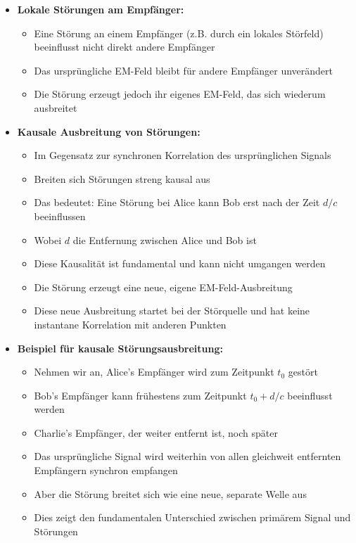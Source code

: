 \documentclass[12pt,a4paper]{article}
\begin{document}
	\begin{itemize}
		\item \textbf{Lokale Störungen am Empfänger:}
		\begin{itemize}
			\item Eine Störung an einem Empfänger (z.B. durch ein lokales Störfeld) beeinflusst nicht direkt andere Empfänger
			\item Das ursprüngliche EM-Feld bleibt für andere Empfänger unverändert
			\item Die Störung erzeugt jedoch ihr eigenes EM-Feld, das sich wiederum ausbreitet
		\end{itemize}
		
		\item \textbf{Kausale Ausbreitung von Störungen:}
		\begin{itemize}
			\item Im Gegensatz zur synchronen Korrelation des ursprünglichen Signals
			\item Breiten sich Störungen streng kausal aus
			\item Das bedeutet: Eine Störung bei Alice kann Bob erst nach der Zeit $d/c$ beeinflussen
			\item Wobei $d$ die Entfernung zwischen Alice und Bob ist
			\item Diese Kausalität ist fundamental und kann nicht umgangen werden
			\item Die Störung erzeugt eine neue, eigene EM-Feld-Ausbreitung
			\item Diese neue Ausbreitung startet bei der Störquelle und hat keine instantane Korrelation mit anderen Punkten
		\end{itemize}
		
		\item \textbf{Beispiel für kausale Störungsausbreitung:}
		\begin{itemize}
			\item Nehmen wir an, Alice's Empfänger wird zum Zeitpunkt $t_0$ gestört
			\item Bob's Empfänger kann frühestens zum Zeitpunkt $t_0 + d/c$ beeinflusst werden
			\item Charlie's Empfänger, der weiter entfernt ist, noch später
			\item Das ursprüngliche Signal wird weiterhin von allen gleichweit entfernten Empfängern synchron empfangen
			\item Aber die Störung breitet sich wie eine neue, separate Welle aus
			\item Dies zeigt den fundamentalen Unterschied zwischen primärem Signal und Störungen
		\end{itemize}
		

\end{itemize}
\end{document}
